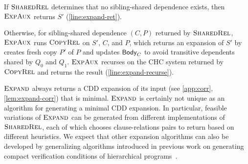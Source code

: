 If $\textsc{SharedRel}$ determines that no sibling-shared dependence
exists, then $\textsc{ExpAux}$ returns $S'$
(\autoref{line:expand-ret}).

Otherwise, for sibling-shared dependence $(C, P)$ returned
by $\textsc{SharedRel}$, $\textsc{ExpAux}$ runs $\textsc{CopyRel} $ on
$S'$, $C$, and $P$, which returns an expansion of
$S'$ by creates fresh copy $P'$ of $P$ and updates $\mathsf{Body}_{C}$ 
to avoid transitive dependents shared by $Q_0$ and $Q_1$.
%
$\textsc{ExpAux}$ recurses on the CHC system returned by $\textsc{CopyRel} $ and returns the result
(\autoref{line:expand-recurse}).
%  

$\textsc{Expand}$ always returns a CDD expansion of its input
(see \autoref{app:corr}, \autoref{lem:expand-corr}) that is minimal.
$\textsc{Expand}$ is certainly not unique as an algorithm for
generating a minimal CDD expansion.
%
In particular, feasible variations of $\textsc{Expand}$ can be
generated from different implementations of $\textsc{SharedRel}$, each of
which chooses clause-relations pairs to return based on different
heuristics.
%
We expect that other expansion algorithms can also be developed by
generalizing algorithms introduced in previous work on generating
compact verification conditions of hierarchical
programs~\cite{lal-qadeer15}.


